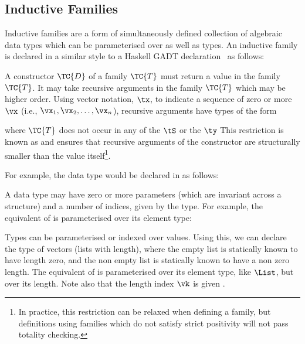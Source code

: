 \subsection{Inductive Families}

\label{sect:inductivefams}

Inductive families \cite{dybjer1994inductive} are a form of simultaneously
defined collection of algebraic data types which can be parameterised over
 as well as types.  An inductive family is declared 
in a similar style to a Haskell GADT declaration~\cite{pj2006gadts}
as
follows:


A constructor $\TC{D}$ of a family $\TC{T}$ must return a value in the family
$\TC{T}$.
It may take recursive arguments in the family $\TC{T}$ which may be
higher order. 
Using vector notation, $\tx$, to indicate a
sequence of zero or more $\vx$ (i.e., $\vx_1,\vx_2,\ldots,\vx_n$),
recursive arguments have types of the form


where $\TC{T}$ does not occur in any of the $\tS$ or the $\ty$
This restriction is known as
 and ensures that recursive arguments of the
constructor are structurally smaller than the value itself\footnote{In
practice, this restriction can be relaxed when defining a family, but definitions
using families which do not satisfy strict positivity will not pass totality
checking.}.

For example, the \Idris{} data type  would be declared in \TT{} as follows:

\DM{
\Data\hg\Nat\Hab\Type\hg\Where\hg\Z\Hab\Nat\;\mid\;\suc\Hab\fbind{\vk}{\Nat}{\Nat}
}

A data type may have zero or more parameters (which are invariant
across a structure) and a number of indices, given by the type. For example,
the \TT{} equivalent of  is parameterised over its element type:

\DM{
\AR{
\Data\hg\List\Hab(\va\Hab\Type)\to\Type\hg\Where\\
\hg\hg
\ARd{
& \nil\Hab\List\;\va\\
\mid & (\cons)\Hab\fbind{\vx}{\va}{\fbind{\vxs}{\List\;\va}{\List\;\va}}
}
}
}

Types can be
parameterised or indexed over values. Using this, we can declare the type of
vectors (lists with length), where the empty list is statically known
to have length zero, and the non empty list is statically known to
have a non zero length. The \TT{} equivalent of  is parameterised over its element type,
like $\List$, but  over its length. Note also that the length
index $\vk$ is given .

